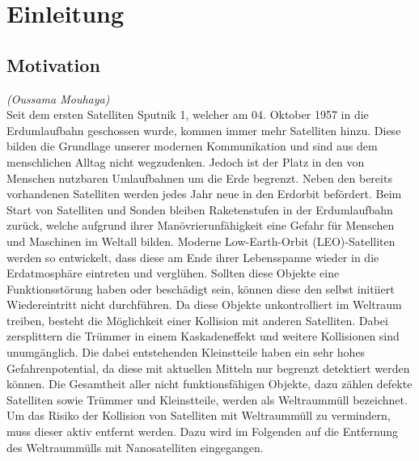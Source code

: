 \chapter{Einleitung}
		\section{Motivation}
	\hfill\emph{(Oussama Mouhaya)}\\
Seit dem ersten Satelliten Sputnik \num{1}, welcher am 04. Oktober 1957 in die Erdumlaufbahn geschossen wurde, kommen immer mehr Satelliten hinzu. Diese bilden die Grundlage unserer modernen Kommunikation und sind aus dem menschlichen Alltag nicht wegzudenken. Jedoch ist der Platz in den von Menschen nutzbaren Umlaufbahnen um die Erde begrenzt. Neben den bereits vorhandenen Satelliten werden jedes Jahr neue in den Erdorbit befördert. Beim Start von Satelliten und Sonden bleiben Raketenstufen in der Erdumlaufbahn zurück, welche aufgrund ihrer Manövrierunfähigkeit eine Gefahr für Menschen und Maschinen im Weltall bilden. Moderne Low-Earth-Orbit (LEO)-Satelliten werden so entwickelt, dass diese am Ende ihrer Lebensspanne wieder in die Erdatmosphäre eintreten und verglühen\cite{.e}. Sollten diese Objekte eine Funktionsstörung haben oder beschädigt sein, können diese den selbst initiiert Wiedereintritt nicht durchführen. Da diese Objekte unkontrolliert im Weltraum treiben, besteht die Möglichkeit einer Kollision mit anderen Satelliten. Dabei zersplittern die Trümmer in einem Kaskadeneffekt und weitere Kollisionen sind unumgänglich. Die dabei entstehenden Kleinstteile haben ein sehr hohes Gefahrenpotential, da diese mit aktuellen Mitteln nur begrenzt detektiert werden können. Die Gesamtheit aller nicht funktionsfähigen Objekte, dazu zählen defekte Satelliten sowie Trümmer und Kleinstteile, werden als Weltraummüll bezeichnet. Um das Risiko der Kollision von Satelliten mit Weltraummüll zu vermindern, muss dieser aktiv entfernt werden. Dazu wird im Folgenden auf die Entfernung des Weltraummülls mit Nanosatelliten eingegangen.

